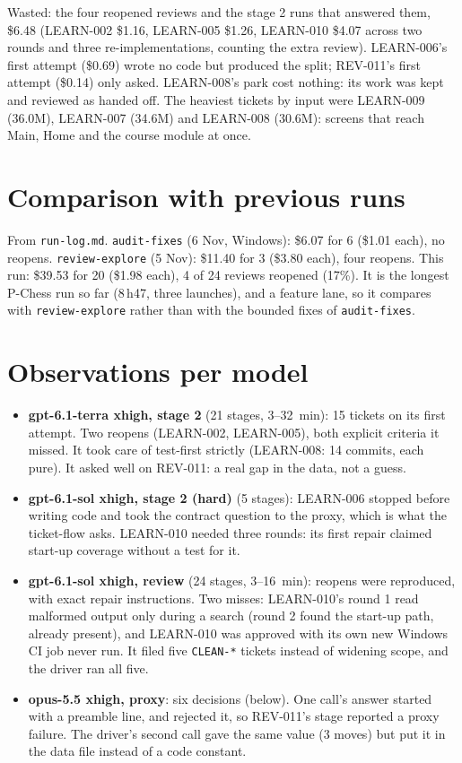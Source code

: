 \documentclass[11pt,a4paper]{article}
\begin{document}
Wasted: the four reopened reviews and the stage 2 runs that answered them, \$6.48 (LEARN-002
\$1.16, LEARN-005 \$1.26, LEARN-010 \$4.07 across two rounds and three re-implementations,
counting the extra review). LEARN-006's first attempt (\$0.69) wrote no code but produced the
split; REV-011's first attempt (\$0.14) only asked. LEARN-008's park cost nothing: its work was kept
and reviewed as handed off. The heaviest tickets by input were LEARN-009 (36.0M), LEARN-007 (34.6M)
and LEARN-008 (30.6M): screens that reach Main, Home and the course module at once.

\section*{Comparison with previous runs}

From \texttt{run-log.md}. \texttt{audit-fixes} (6 Nov, Windows): \$6.07 for 6 (\$1.01 each), no reopens.
\texttt{review-explore} (5 Nov): \$11.40 for 3 (\$3.80 each), four reopens. This run: \$39.53 for 20
(\$1.98 each), 4 of 24 reviews reopened (17\%). It is the longest P-Chess run so far (8\,h47, three
launches), and a feature lane, so it compares with \texttt{review-explore} rather than with the bounded
fixes of \texttt{audit-fixes}.

\section*{Observations per model}

\begin{itemize}
  \item \textbf{gpt-6.1-terra xhigh, stage 2} (21 stages, 3--32~min): 15 tickets on its first
        attempt. Two reopens (LEARN-002, LEARN-005), both explicit criteria it missed. It took care
        of test-first strictly (LEARN-008: 14 commits, each pure). It asked well on REV-011: a
        real gap in the data, not a guess.
  \item \textbf{gpt-6.1-sol xhigh, stage 2 (hard)} (5 stages): LEARN-006 stopped before writing
        code and took the contract question to the proxy, which is what the ticket-flow asks.
        LEARN-010 needed three rounds: its first repair claimed start-up coverage without a test for it.
  \item \textbf{gpt-6.1-sol xhigh, review} (24 stages, 3--16~min): reopens were reproduced, with
        exact repair instructions. Two misses: LEARN-010's round 1 read malformed output only
        during a search (round 2 found the start-up path, already present), and LEARN-010 was
        approved with its own new Windows CI job never run. It filed five \texttt{CLEAN-*} tickets
        instead of widening scope, and the driver ran all five.
  \item \textbf{opus-5.5 xhigh, proxy}: six decisions (below). One call's answer started with a
        preamble line, and  rejected it, so REV-011's stage reported a proxy
        failure. The driver's second call gave the same value (3 moves) but put it in the data
        file instead of a code constant.
\end{itemize}
\end{document}
